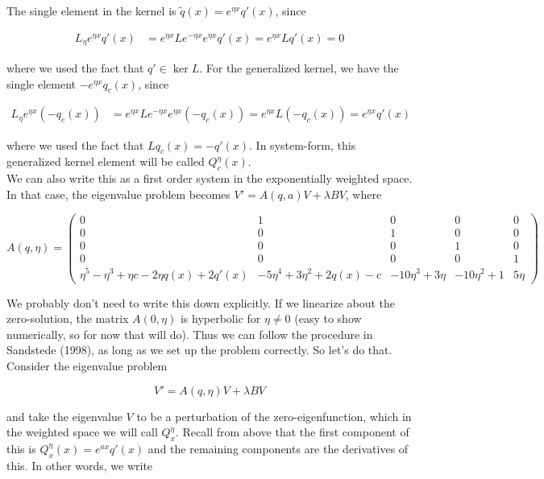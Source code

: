 \documentclass[12pt]{article}
\begin{document}
The single element in the kernel is $\tilde{q}(x) = e^{\eta x} q'(x)$, since

\begin{align*}
L_\eta e^{\eta x} q'(x) &= e^{\eta x} L e^{-\eta x} e^{\eta x} q'(x) = e^{\eta x} L q'(x) = 0
\end{align*}

where we used the fact that $q' \in \ker L$. For the generalized kernel, we have the single element $-e^{\eta x} q_c(x)$, since

\begin{align*}
L_\eta e^{\eta x} (-q_c(x)) &= e^{\eta x} L e^{-\eta x} e^{\eta x} (-q_c(x)) = e^{\eta x} L (-q_c(x)) = e^{\eta x} q'(x)
\end{align*}

where we used the fact that $L q_c(x) = -q'(x)$. In system-form, this generalized kernel element will be called $Q^\eta_c(x)$.\\

We can also write this as a first order system in the exponentially weighted space. In that case, the eigenvalue problem becomes $V' = A(q, a)V + \lambda B V$, where

\[
A(q, \eta) = 
\begin{pmatrix}0 & 1 & 0 & 0 & 0 \\0 & 0 & 1 & 0 & 0 \\0 & 0 & 0 & 1 & 0 \\0 & 0 & 0 & 0 & 1 \\
\eta^5 - \eta^3 + \eta c - 2 \eta q(x) + 2q'(x) & -5\eta^4 + 3\eta^2 + 2q(x) - c & -10\eta^3 + 3\eta & -10\eta^2 + 1 & 5\eta \end{pmatrix} 
\]

We probably don't need to write this down explicitly. If we linearize about the zero-solution, the matrix $A(0, \eta)$ is hyperbolic for $\eta \neq 0$ (easy to show numerically, so for now that will do). Thus we can follow the procedure in Sandstede (1998), as long as we set up the problem correctly. So let's do that.\\

Consider the eigenvalue problem

\[
V' = A(q, \eta)V + \lambda B V
\]

and take the eigenvalue $V$ to be a perturbation of the zero-eigenfunction, which in the weighted space we will call $Q^\eta_x$. Recall from above that the first component of this is $Q^\eta_x(x) = e^{ax} q'(x)$ and the remaining components are the derivatives of this. In other words, we write
\end{document}
